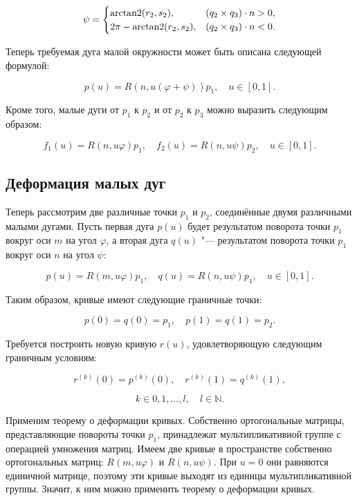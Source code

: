 \begin{equation}
\psi=
 \begin{cases}
   \operatorname{arctan2}(r_2,s_2),      & (q_2\times q_3)\cdot n>0, \\
   2\pi-\operatorname{arctan2}(r_2,s_2), & (q_2\times q_3)\cdot n<0.
 \end{cases}
\label{two-dimension-sphere-psi-angle}
\end{equation}

Теперь требуемая дуга малой окружности может быть описана следующей формулой:

\begin{equation}
p(u)=R(n,u(\varphi+\psi))p_1, \quad u \in [0,1].
\label{two-dimension-arc}
\end{equation}

Кроме того, малые дуги от $p_1$ к $p_2$ и от $p_2$ к $p_3$ можно выразить следующим образом:

$$
f_1(u)=R(n,u\varphi)p_1, \quad f_2(u)=R(n,u\psi)p_2, \quad u \in [0,1].
$$

\subsection*{Деформация малых дуг}

Теперь рассмотрим две различные точки $p_1$ и $p_2$, соединённые двумя различными малыми дугами. Пусть первая дуга
$p(u)$ будет результатом поворота точки $p_1$ вокруг оси $m$ на угол $\varphi$, а вторая дуга $q(u)$ "--- результатом
поворота точки $p_1$ вокруг оси $n$ на угол $\psi$:

$$
p(u)=R(m,u\varphi)p_1, \quad q(u)=R(n,u\psi)p_1, \quad u \in [0,1].
$$

Таким образом, кривые имеют следующие граничные точки:

$$
p(0)=q(0)=p_1, \quad p(1)=q(1)=p_2.
$$

Требуется построить новую кривую $r(u)$, удовлетворяющую следующим граничным условиям:

$$
r^{(k)}(0)=p^{(k)}(0), \quad r^{(k)}(1)=q^{(k)}(1),
$$

$$
k \in {0,1,\dots,l}, \quad l \in \mathbb{N}.
$$

Применим теорему о деформации кривых. Собственно ортогональные матрицы, представляющие повороты
точки $p_1$, принадлежат мультипликативной группе с операцией умножения матриц. Имеем две кривые в пространстве
собственно ортогональных матриц: $R(m,u\varphi)$ и $R(n,u\psi)$. При $u=0$ они равняются единичной матрице, поэтому эти
кривые выходят из единицы мультипликативной группы. Значит, к ним можно применить теорему о деформации кривых.

